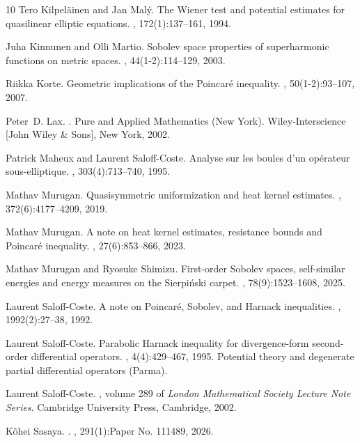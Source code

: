 \documentclass[11pt,a4paper]{article}
\numberwithin{equation}{section}
\theoremstyle{plain}
\theoremstyle{definition}
\begin{document}
\begin{thebibliography}{10}
Tero Kilpel\"ainen and Jan Mal\'y.
\newblock The {W}iener test and potential estimates for quasilinear elliptic
  equations.
, 172(1):137--161, 1994.

Juha Kinnunen and Olli Martio.
\newblock Sobolev space properties of superharmonic functions on metric spaces.
, 44(1-2):114--129, 2003.

Riikka Korte.
\newblock Geometric implications of the {P}oincar\'e{} inequality.
, 50(1-2):93--107, 2007.

Peter~D. Lax.
.
\newblock Pure and Applied Mathematics (New York). Wiley-Interscience [John
  Wiley \& Sons], New York, 2002.

Patrick Maheux and Laurent Saloff-Coste.
\newblock Analyse sur les boules d'un op\'erateur sous-elliptique.
, 303(4):713--740, 1995.

Mathav Murugan.
\newblock Quasisymmetric uniformization and heat kernel estimates.
, 372(6):4177--4209, 2019.

Mathav Murugan.
\newblock A note on heat kernel estimates, resistance bounds and {P}oincar\'e{}
  inequality.
, 27(6):853--866, 2023.

Mathav Murugan and Ryosuke Shimizu.
\newblock First-order {S}obolev spaces, self-similar energies and energy
  measures on the {S}ierpi\'nski carpet.
, 78(9):1523--1608, 2025.

Laurent Saloff-Coste.
\newblock A note on {P}oincar\'{e}, {S}obolev, and {H}arnack inequalities.
, 1992(2):27--38, 1992.

Laurent Saloff-Coste.
\newblock Parabolic {H}arnack inequality for divergence-form second-order
  differential operators.
, 4(4):429--467, 1995.
\newblock Potential theory and degenerate partial differential operators
  (Parma).

Laurent Saloff-Coste.
, volume 289 of {\em
  London Mathematical Society Lecture Note Series}.
\newblock Cambridge University Press, Cambridge, 2002.

K{\^o}hei {Sasaya}.
.
, 291(1):Paper No. 111489, 2026.


\end{thebibliography}
\end{document}
